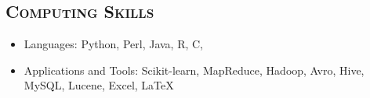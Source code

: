 \begin{resume}



\section{\textsc{Computing Skills}}
\begin{itemize}
\item Languages: Python, Perl, Java, R, C, \Cplusplus %
\item Applications and Tools: Scikit-learn, MapReduce, Hadoop, Avro, Hive, MySQL, Lucene, Excel, \LaTeX
\end{itemize}



\end{resume}
